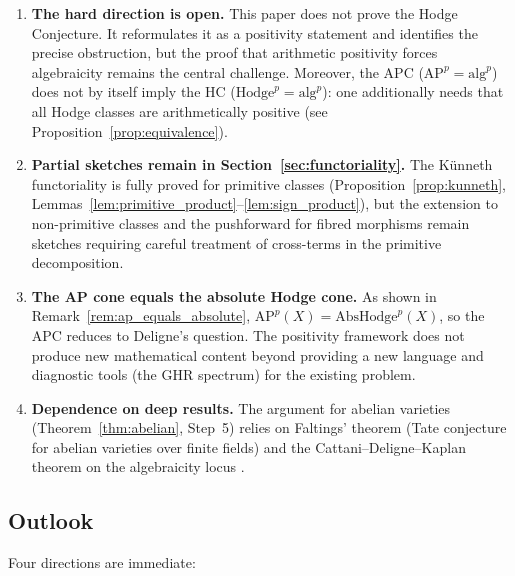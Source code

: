 \documentclass[aps,prd,twocolumn,superscriptaddress,nofootinbib]{revtex4-2}
\theoremstyle{definition}
\theoremstyle{remark}
\begin{document}
\begin{enumerate}
\item \textbf{The hard direction is open.} This paper does not prove the Hodge Conjecture. It reformulates it as a positivity statement and identifies the precise obstruction, but the proof that arithmetic positivity forces algebraicity remains the central challenge. Moreover, the APC ($\mathrm{AP}^p = \mathrm{alg}^p$) does not by itself imply the HC ($\mathrm{Hodge}^p = \mathrm{alg}^p$): one additionally needs that all Hodge classes are arithmetically positive (see Proposition~\ref{prop:equivalence}).

\item \textbf{Partial sketches remain in Section~\ref{sec:functoriality}.} The K\"unneth functoriality is fully proved for primitive classes (Proposition~\ref{prop:kunneth}, Lemmas~\ref{lem:primitive_product}--\ref{lem:sign_product}), but the extension to non-primitive classes and the pushforward for fibred morphisms remain sketches requiring careful treatment of cross-terms in the primitive decomposition.

\item \textbf{The AP cone equals the absolute Hodge cone.} As shown in Remark~\ref{rem:ap_equals_absolute}, $\mathrm{AP}^p(X) = \mathrm{AbsHodge}^p(X)$, so the APC reduces to Deligne's question. The positivity framework does not produce new mathematical content beyond providing a new language and diagnostic tools (the GHR spectrum) for the existing problem.

\item \textbf{Dependence on deep results.} The argument for abelian varieties (Theorem~\ref{thm:abelian}, Step~5) relies on Faltings' theorem (Tate conjecture for abelian varieties over finite fields) \cite{Faltings1983} and the Cattani--Deligne--Kaplan theorem on the algebraicity locus \cite{CattaniDeligneKaplan1995}.
\end{enumerate}

\subsection{Outlook}

Four directions are immediate:
\end{document}
